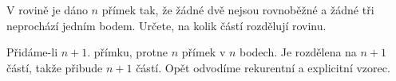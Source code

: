 \begin{priklad}
V rovině je dáno $n$ přímek tak, že žádné dvě nejsou rovnoběžné a žádné tři neprochází
jedním bodem. Určete, na kolik částí rozdělují
rovinu.
\end{priklad}

\begin{reseni}
Přidáme-li $n+1.$ přímku, protne $n$ přímek v $n$ bodech. Je rozdělena na
$n+1$ částí, takže přibude $n+1$ částí. Opět odvodíme
rekurentní a explicitní vzorec.
\end{reseni}
